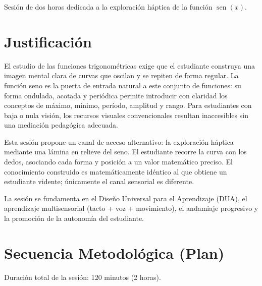 \documentclass[14pt, a4paper]{extarticle}
\begin{document}
\vspace{1.5cm}

Sesi\'on de dos horas dedicada a la exploraci\'on h\'aptica de la funci\'on
$\operatorname{sen}(x)$.

\vspace{1cm}

\section{Justificaci\'on}

El estudio de las funciones trigonom\'etricas exige que el estudiante construya
una imagen mental clara de curvas que oscilan y se repiten de forma regular. La
funci\'on seno es la puerta de entrada natural a este conjunto de funciones: su
forma ondulada, acotada y peri\'odica permite introducir con claridad los
conceptos de m\'aximo, m\'inimo, per\'iodo, amplitud y rango. Para estudiantes
con baja o nula visi\'on, los recursos visuales convencionales resultan
inaccesibles sin una mediaci\'on pedag\'ogica adecuada.

Esta sesi\'on propone un canal de acceso alternativo: la exploraci\'on h\'aptica
mediante una l\'amina en relieve del seno. El estudiante recorre la curva con los
dedos, asociando cada forma y posici\'on a un valor matem\'atico preciso. El
conocimiento construido es matem\'aticamente id\'entico al que obtiene un
estudiante vidente; \'unicamente el canal sensorial es diferente.

La sesi\'on se fundamenta en el Dise\~no Universal para el Aprendizaje (DUA), el
aprendizaje multisensorial (tacto + voz + movimiento), el andamiaje progresivo y
la promoci\'on de la autonom\'ia del estudiante.

\section{Secuencia Metodol\'ogica (Plan)}

\noindent Duraci\'on total de la sesi\'on: 120 minutos (2 horas).

\vspace{8pt}
\end{document}
